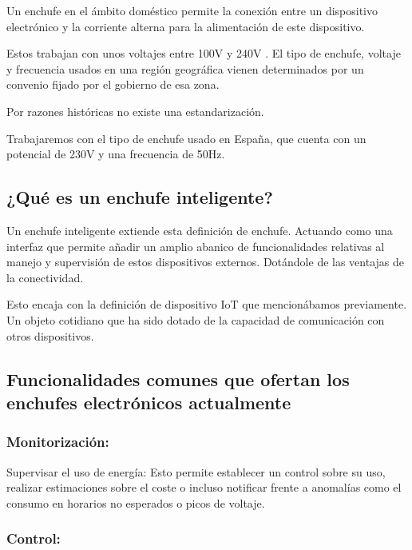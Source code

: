 \documentclass[a4paper,10pt]{article}
\begin{document}
Un enchufe en el ámbito doméstico permite la conexión entre un
dispositivo electrónico y la corriente alterna para la alimentación de
este dispositivo.

Estos trabajan con unos voltajes entre 100V y 240V
\cite{iecIECWorldPlugs}. El tipo de enchufe, voltaje y frecuencia
usados en una región geográfica vienen determinados por un convenio
fijado por el gobierno de esa zona.

Por razones históricas\cite{nuevatribunaOrigenFrecuenciasElectricas}
no existe una estandarización.

Trabajaremos con el tipo de enchufe usado en España, que cuenta con un
potencial de 230V y una frecuencia de 50Hz\cite{IECWorldPlugs}.


\subsection{¿Qué es un enchufe
inteligente?}\label{quuxe9-es-un-enchufe-inteligente}

Un enchufe inteligente extiende esta definición de enchufe. Actuando
como una interfaz que permite añadir un amplio abanico de
funcionalidades relativas al manejo y supervisión de estos dispositivos
externos. Dotándole de las ventajas de la conectividad.

Esto encaja con la definición de dispositivo IoT que mencionábamos
previamente. Un objeto cotidiano que ha sido dotado de la capacidad de
comunicación con otros dispositivos.

\subsection{Funcionalidades comunes que ofertan los enchufes
electrónicos
actualmente}\label{funcionalidades-comunes-que-ofertan-los-enchufes-electruxf3nicos-actualmente}

\subsubsection{Monitorización:}\label{monitorizaciuxf3n}

Supervisar el uso de energía: Esto permite establecer un control sobre
su uso, realizar estimaciones sobre el coste o incluso notificar frente
a anomalías como el consumo en horarios no esperados o picos de voltaje.

\subsubsection{Control:}\label{control}
\end{document}
